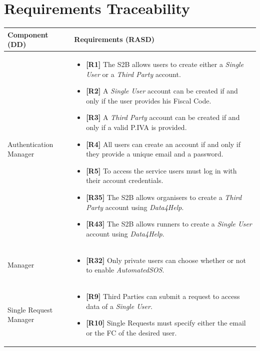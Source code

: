 \documentclass[titlepage]{article}
\begin{document}

\section{Requirements Traceability}

\begin{longtable}{| p{5 cm} | p{8 cm} |} \hline
		Component (DD) & Requirements (RASD)  \\ \hline
		\newline Authentication Manager & 
		\begin{itemize}
			\item {\bf [R1]} The S2B allows users to create either a {\it Single User} or a {\it Third Party} account. 
			\item {\bf [R2]} A {\it Single User} account can be created if and only if the user provides his Fiscal Code. 
			\item {\bf [R3]} A {\it Third Party} account can be created if and only if a valid P.IVA is provided. 
			\item {\bf [R4]} All users can create an account if and only if they provide a unique email and a password. 
			\item {\bf [R5]} To access the service users must log in with their account credentials.
			\item {\bf [R35]} The S2B allows organisers to create a {\it Third Party} account using {\it Data4Help}.
			\item {\bf [R43]} The S2B allows runners to create a {\it Single User} account using {\it Data4Help}.
		\end{itemize}	\\ \hline
		\newline {\it Single User} Manager & 
		\begin{itemize}
			\item {\bf [R32]} Only private users can choose whether or not to enable {\it AutomatedSOS}. 
		\end{itemize}		
		\\	 \hline	
		\newline Single Request Manager & 
		\begin{itemize}
			\item {\bf [R9]} Third Parties can submit a request to access data of a {\it Single User}. 
			\item {\bf [R10]} Single Requests must specify either the email or the FC of the desired user.

\end{itemize}
\end{longtable}
\end{document}
